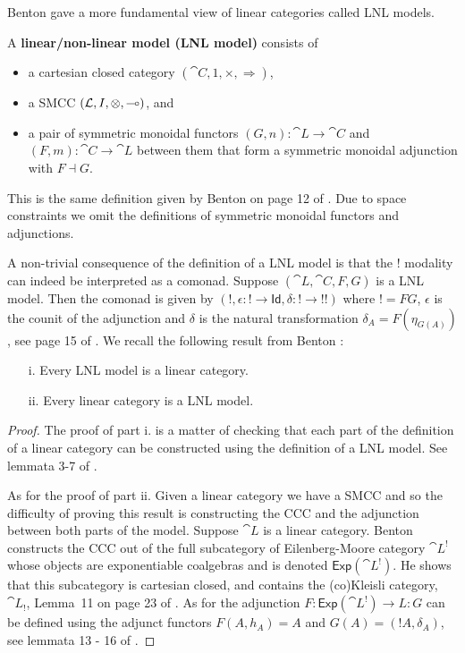 Benton gave a more fundamental view of linear categories called LNL
models.
\begin{definition}
  \label{def:LNL-model}
  A \textbf{linear/non-linear model (LNL model)} consists of
  \begin{itemize}
  \item a cartesian closed category $(\cat{C}, 1, \times,
    \Rightarrow)$,
  \item a SMCC $(\mathcal{L},I,\otimes,\multimap)$, and
  \item a pair of symmetric monoidal functors $(G,n) : \cat{L} \to
    \cat{C}$ and $(F,m) : \cat{C} \to \cat{L}$ between them that form
    a symmetric monoidal adjunction with $F \dashv G$.
  \end{itemize}
  This is the same definition given by Benton on page 12 of
  \cite{Benton:1994}.  Due to space constraints we omit the
  definitions of symmetric monoidal functors and adjunctions.
\end{definition}
A non-trivial consequence of the definition of a LNL model is that the
$!$ modality can indeed be interpreted as a comonad.  Suppose
$(\cat{L}, \cat{C},F,G)$ is a LNL model. Then the comonad is given by
$(\mathop{!}, \epsilon : \mathop{!} \to \mathsf{Id}, \delta :
\mathop{!} \to \mathop{!!})$
where $! = FG$, $\epsilon$ is the counit of the adjunction and
$\delta$ is the natural transformation $\delta_A = F(\eta_{G(A)})$,
see page 15 of \cite{Benton:1994}.  We recall the following result
from Benton \cite{Benton:1994}:
\begin{theorem}
  \label{thm:lnl_models_are_linear_categories}
  \begin{itemize}
  \item[]
  \item[i.] Every LNL model is a linear category.
  \item[ii.] Every linear category is a LNL model.
  \end{itemize}
\end{theorem}
\begin{proof}
  The proof of part i. is a matter of checking that each part of the
  definition of a linear category can be constructed using the
  definition of a LNL model. See lemmata 3-7 of \cite{Benton:1994}.

  As for the proof of part ii. Given a linear category we have a SMCC and so the difficulty of
  proving this result is constructing the CCC and the adjunction
  between both parts of the model.  Suppose $\cat{L}$ is a linear
  category.  Benton constructs the CCC out of the full subcategory of
  Eilenberg-Moore category $\cat{L}^!$ whose objects are exponentiable
  coalgebras and is denoted $\mathsf{Exp}(\cat{L}^!)$.  He shows that
  this subcategory is cartesian closed, and contains the (co)Kleisli
  category, $\cat{L}_!$, Lemma~11 on page 23 of \cite{Benton:1994}.
  As for the adjunction
  $F : \mathsf{Exp}(\cat{L}^!) \to L : G$ can be defined using the
  adjunct functors $F(A,h_A) = A$ and $G(A) = (!A,\delta_A)$, see
  lemmata 13 - 16 of \cite{Benton:1994}.
\end{proof}

